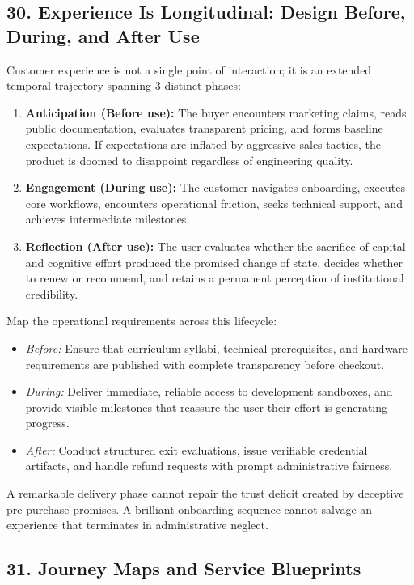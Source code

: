 \subsection*{30. Experience Is Longitudinal: Design Before, During, and After Use}

Customer experience is not a single point of interaction; it is an extended temporal trajectory spanning 3 distinct phases:
\begin{enumerate}
    \item \textbf{Anticipation (Before use):} The buyer encounters marketing claims, reads public documentation, evaluates transparent pricing, and forms baseline expectations. If expectations are inflated by aggressive sales tactics, the product is doomed to disappoint regardless of engineering quality.
    \item \textbf{Engagement (During use):} The customer navigates onboarding, executes core workflows, encounters operational friction, seeks technical support, and achieves intermediate milestones.
    \item \textbf{Reflection (After use):} The user evaluates whether the sacrifice of capital and cognitive effort produced the promised change of state, decides whether to renew or recommend, and retains a permanent perception of institutional credibility.
\end{enumerate}

Map the operational requirements across this lifecycle:
\begin{itemize}
    \item \emph{Before:} Ensure that curriculum syllabi, technical prerequisites, and hardware requirements are published with complete transparency before checkout.
    \item \emph{During:} Deliver immediate, reliable access to development sandboxes, and provide visible milestones that reassure the user their effort is generating progress.
    \item \emph{After:} Conduct structured exit evaluations, issue verifiable credential artifacts, and handle refund requests with prompt administrative fairness.
\end{itemize}

A remarkable delivery phase cannot repair the trust deficit created by deceptive pre-purchase promises. A brilliant onboarding sequence cannot salvage an experience that terminates in administrative neglect.

\subsection*{31. Journey Maps and Service Blueprints}

